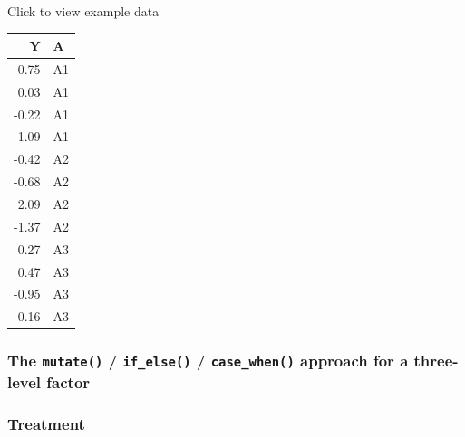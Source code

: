 \documentclass[]{book}
\newenvironment{Shaded}{\begin{snugshade}}{\end{snugshade}}
\newcommand{\CommentTok}[1]{\textcolor[rgb]{0.56,0.35,0.01}{\textit{#1}}}
\newcommand{\DataTypeTok}[1]{\textcolor[rgb]{0.13,0.29,0.53}{#1}}
\newcommand{\KeywordTok}[1]{\textcolor[rgb]{0.13,0.29,0.53}{\textbf{#1}}}
\newcommand{\NormalTok}[1]{#1}
\newcommand{\OperatorTok}[1]{\textcolor[rgb]{0.81,0.36,0.00}{\textbf{#1}}}
\newcommand{\StringTok}[1]{\textcolor[rgb]{0.31,0.60,0.02}{#1}}
\begin{document}
Click to view example data

\begin{table}[H]
\centering
\begin{tabular}{r|l}
\hline
Y & A\\
\hline
-0.75 & A1\\
\hline
0.03 & A1\\
\hline
-0.22 & A1\\
\hline
1.09 & A1\\
\hline
-0.42 & A2\\
\hline
-0.68 & A2\\
\hline
2.09 & A2\\
\hline
-1.37 & A2\\
\hline
0.27 & A3\\
\hline
0.47 & A3\\
\hline
-0.95 & A3\\
\hline
0.16 & A3\\
\hline
\end{tabular}
\end{table}

\hypertarget{the-mutate-if_else-case_when-approach-for-a-three-level-factor}{%
\subsubsection{\texorpdfstring{The \texttt{mutate()} / \texttt{if\_else()} / \texttt{case\_when()} approach for a three-level factor}{The mutate() / if\_else() / case\_when() approach for a three-level factor}}\label{the-mutate-if_else-case_when-approach-for-a-three-level-factor}}

\hypertarget{treatment}{%
\subsubsection{Treatment}\label{treatment}}

\begin{Shaded}
\end{Shaded}
\end{document}

